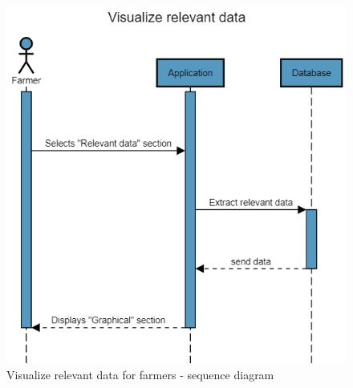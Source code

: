 \begin{figure}[H]
	\centering
    \includegraphics[page=1, scale=0.6]{RASD/Images/Sequence diagrams/SW2 - Visualize relevant data (fa).png}
	\caption{\label{fig:forum_generation_seq_diag}Visualize relevant data for farmers - sequence diagram}
\end{figure}